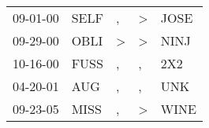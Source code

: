\begin{supertabular}{lllll}
 09-01-00 &  SELF &             , &  \textgreater &  JOSE \\
 09-29-00 &  OBLI &  \textgreater &  \textgreater &  NINJ \\
 10-16-00 &  FUSS &             , &             , &   2X2 \\
 04-20-01 &   AUG &             , &             , &   UNK \\
 09-23-05 &  MISS &             , &  \textgreater &  WINE \\
\end{supertabular}
